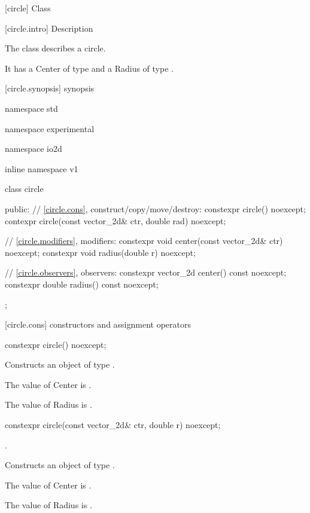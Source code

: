  [circle] {Class }

 [circle.intro] { Description}

\pnum
{}
The class  describes a circle.

\pnum
It has a Center of type  and a Radius of type .

 [circle.synopsis] { synopsis}

\begin{codeblock}
namespace std { namespace experimental { namespace io2d { inline namespace v1 {
  class circle {
  public:
    // \ref{circle.cons}, construct/copy/move/destroy:
    constexpr circle() noexcept;
    contexpr circle(const vector_2d& ctr, double rad) noexcept;

    // \ref{circle.modifiers}, modifiers:
    constexpr void center(const vector_2d& ctr) noexcept;
    constexpr void radius(double r) noexcept;
    
    // \ref{circle.observers}, observers:
    constexpr vector_2d center() const noexcept;
    constexpr double radius() const noexcept;
  };
} } } }
\end{codeblock}

 [circle.cons] { constructors and assignment operators}

\begin{itemdecl}
constexpr circle() noexcept;
\end{itemdecl}
\begin{itemdescr}
\pnum
\effects
Constructs an object of type .

\pnum
The value of Center is .

\pnum
The value of Radius is .
\end{itemdescr}

\begin{itemdecl}
constexpr circle(const vector_2d& ctr, double r) noexcept;
\end{itemdecl}
\begin{itemdescr}
\preconditions
{}.

\pnum
\effects
Constructs an object of type .

\pnum
The value of Center is .

\pnum
The value of Radius is .
\end{itemdescr}

